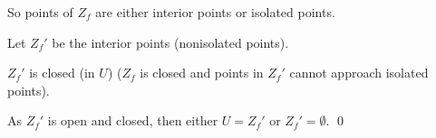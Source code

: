 \documentclass[10pt,aspectratio=169]{beamer}
\begin{document}
\begin{frame}

So points of $Z_f$ are either interior points or isolated points.

\medskip
\pause

Let $Z_f'$ be the interior points (nonisolated points).

\medskip
\pause

$Z_f'$ is closed (in $U$) ($Z_f$ is closed
and points in $Z_f'$ cannot approach isolated points).

\medskip
\pause

As $Z_f'$ is open and closed, then either $U=Z_f'$ or $Z_f' = \emptyset$.
\qed

\end{frame}
\end{document}
